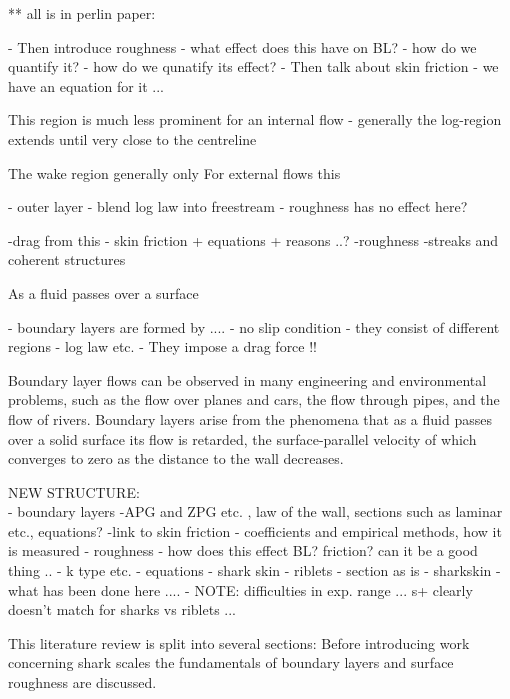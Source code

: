 \documentclass[12pt,oneside,a4paper]{article}
\begin{document}
\vspace{2cm}
** all is in perlin paper: 

-	Then introduce roughness - what effect does this have on BL?
-	how do we quantify it?
-	how do we qunatify its effect?
-	Then talk about skin friction - we have an equation for it ...


 This region is much less prominent for an internal flow - generally the log-region extends until very close to the centreline


The wake region generally only  For external flows this 
\vspace{2cm}

- outer layer - blend log law into freestream - roughness has no effect here?

-drag from this - skin friction + equations + reasons ..?
-roughness
-streaks and coherent structures





As a fluid passes over a surface 

-	boundary layers are formed by ....
		-	no slip condition
		-	they consist of different regions - log law etc. 
		-	They impose a drag force !!


Boundary layer flows can be observed in many engineering and environmental problems, such as the flow over planes and cars, the flow through pipes, and the flow of rivers. Boundary layers arise from the phenomena that as a fluid passes over a solid surface its flow is retarded, the surface-parallel velocity of which converges to zero as the distance to the wall decreases.

NEW STRUCTURE:\\
-	boundary layers
			-APG and ZPG etc. , law of the wall, sections such as laminar etc., equations?
			-link to skin friction - coefficients and empirical methods, how it is measured
-	roughness
			-	how does this effect BL? friction? can it be a good thing ..
			-	k type etc. 
			-	equations
-	shark skin
	-	riblets - section as is
	-	sharkskin	-	what has been done here ....
					-	NOTE:	difficulties in exp. range ... s+ clearly doesn't match for sharks vs riblets ...

\vspace{2cm}


This literature review is split into several sections: Before introducing work concerning shark scales the fundamentals of boundary layers and surface roughness are discussed.
\end{document}
